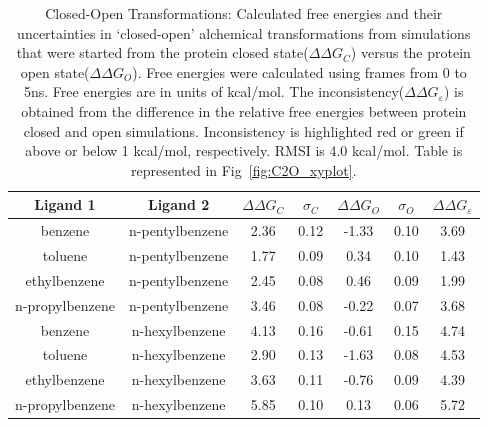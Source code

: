 \begin{table}[!htb]
\centering
\caption{Closed-Open Transformations:
Calculated free energies and their uncertainties in `closed-open' alchemical transformations from simulations that were started from the protein closed state(\boldmath$\Delta\Delta G_{C}$) versus the protein open state(\boldmath$\Delta\Delta G_{O}$).
Free energies were calculated using frames from 0 to 5ns.  
Free energies are in units of kcal/mol. 
The inconsistency(\boldmath$\Delta\Delta G_{\varepsilon}$) is obtained from the difference in the relative free energies between protein closed and open simulations. 
Inconsistency is highlighted red or green if above or below 1 kcal/mol, respectively.
RMSI is 4.0 kcal/mol.
Table is represented in Fig~\ref{fig:C2O_xyplot}.
}
\label{tbl:C-O}
\begin{tabular}{|c|c|c|c|c|c|c|}
\hline
\textbf{Ligand 1}       & \textbf{Ligand 2}    & \boldmath$\Delta\Delta G_{C}$ & \boldmath$\sigma_{C}$ & \boldmath$\Delta\Delta G_{O}$ & \boldmath$\sigma_{O}$ & \boldmath$\Delta\Delta G_{\varepsilon}$ \\ \hline
benzene         & n-pentylbenzene & 2.36       & 0.12  & -1.33  & 0.10  & \cellcolor[HTML]{FFCCC9}3.69 \\ \hline
toluene         & n-pentylbenzene & 1.77       & 0.09  & 0.34   & 0.10  & \cellcolor[HTML]{FFCCC9}1.43 \\ \hline
ethylbenzene    & n-pentylbenzene & 2.45       & 0.08  & 0.46   & 0.09  & \cellcolor[HTML]{FFCCC9}1.99 \\ \hline
n-propylbenzene & n-pentylbenzene & 3.46       & 0.08  & -0.22  & 0.07  & \cellcolor[HTML]{FFCCC9}3.68 \\ \hline
benzene         & n-hexylbenzene  & 4.13       & 0.16  & -0.61  & 0.15  & \cellcolor[HTML]{FFCCC9}4.74 \\ \hline
toluene         & n-hexylbenzene  & 2.90       & 0.13  & -1.63  & 0.08  & \cellcolor[HTML]{FFCCC9}4.53 \\ \hline
ethylbenzene    & n-hexylbenzene  & 3.63       & 0.11  & -0.76  & 0.09  & \cellcolor[HTML]{FFCCC9}4.39 \\ \hline
n-propylbenzene & n-hexylbenzene  & 5.85       & 0.10  & 0.13   & 0.06  & \cellcolor[HTML]{FFCCC9}5.72 \\ \hline
\end{tabular}
\end{table}

